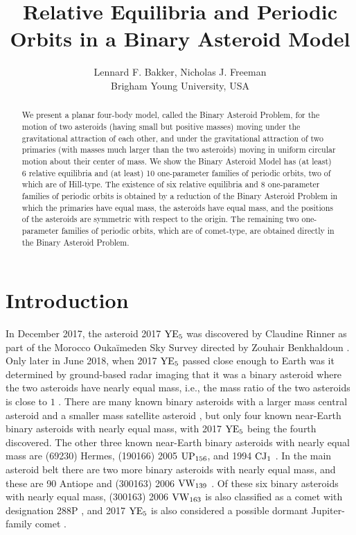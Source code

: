 \documentclass[12pt]{article}
\begin{document}
\title{Relative Equilibria and Periodic Orbits in a Binary Asteroid Model}

\author{Lennard F. Bakker, Nicholas J. Freeman \\ Brigham Young University, USA} %

\maketitle


\begin{abstract}We present a planar four-body model, called the Binary Asteroid Problem, for the motion of two asteroids (having small but positive masses) moving under the gravitational attraction of each other, and under the gravitational attraction of two primaries (with masses much larger than the two asteroids) moving in uniform circular motion about their center of mass. We show the Binary Asteroid Model has (at least) 6 relative equilibria and (at least) 10 one-parameter families of periodic orbits, two of which are of Hill-type. The existence of six relative equilibria and 8 one-parameter families of periodic orbits is obtained by a reduction of the Binary Asteroid Problem in which the primaries have equal mass, the asteroids have equal mass, and the positions of the asteroids are symmetric with respect to the origin. The remaining two one-parameter families of periodic orbits, which are of comet-type, are obtained directly in the Binary Asteroid Problem.\end{abstract}



\section{Introduction}\label{sec1}
In December 2017, the asteroid 2017 ${\rm YE}_5$ was discovered by Claudine Rinner as part of the Morocco Ouka\"imeden Sky Survey directed by Zouhair Benkhaldoun \cite{Davis}. Only later in June 2018, when 2017 ${\rm YE}_5$ passed close enough to Earth was it determined by ground-based radar imaging that it was a binary asteroid where the two asteroids have nearly equal mass, i.e., the mass ratio of the two asteroids is close to $1$ \cite{nasa}. There are many known binary asteroids with a larger mass central asteroid and a smaller mass satellite asteroid \cite{Johnston}, but only four known near-Earth binary asteroids with nearly equal mass, with 2017 ${\rm YE}_5$ being the fourth discovered. The other three known near-Earth binary asteroids with nearly equal mass are (69230) Hermes, (190166) 2005 ${\rm UP}_{156}$, and 1994 ${\rm CJ}_1$ \cite{Monteiro}. In the main asteroid belt there are two more binary asteroids with nearly equal mass, and these are 90 Antiope and (300163) 2006 ${\rm VW}_{139}$ \cite{Johnston}. Of these six binary asteroids with nearly equal mass, (300163) 2006 ${\rm VW}_{163}$ is also classified as a comet with designation 288P \cite{Johnston}, and 2017 ${\rm YE}_5$ is also considered a possible dormant Jupiter-family comet \cite{Monteiro}.
\end{document}
